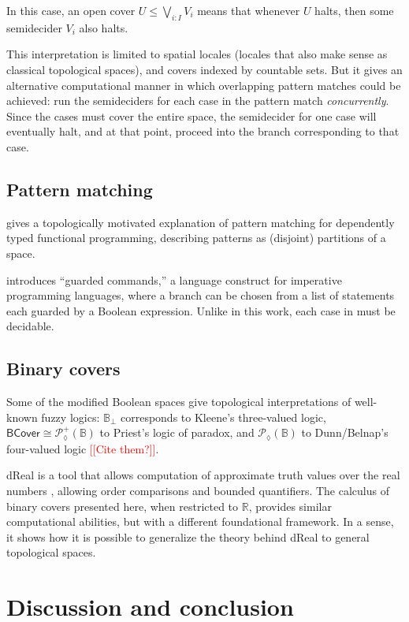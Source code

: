 \documentclass[conference]{IEEEtran}
\newcommand{\PLower}{\mathcal{P}_\lozenge}
\newcommand{\R}{\mathbb{R}}
\newcommand{\bool}{\mathbb{B}}
\newcommand{\BCover}{\mathsf{BCover}}
\newcommand{\note}[1]{\textcolor{red}{[[{#1}]]}}
\begin{document}
In this case, an open cover $U \le \bigvee_{i : I} V_i$ means that whenever $U$ halts, then some semidecider $V_i$ also halts.

This interpretation is limited to spatial locales (locales that also make sense as classical topological spaces), and covers indexed by countable sets. But it gives an alternative computational manner in which overlapping pattern matches could be achieved: run the semideciders for each case in the pattern match \emph{concurrently}. Since the cases must cover the entire space, the semidecider for one case will eventually halt, and at that point, proceed into the branch corresponding to that case.

\subsection{Pattern matching}

\cite{coquand1992} gives a topologically motivated explanation of pattern matching for dependently typed functional programming, describing patterns as (disjoint) partitions of a space.

\cite{dijkstra} introduces ``guarded commands,'' a language construct for imperative programming languages, where a branch can be chosen from a list of statements each guarded by a Boolean expression. Unlike in this work, each case in \cite{dijkstra} must be decidable.

\subsection{Binary covers}

Some of the modified Boolean spaces give topological interpretations of well-known fuzzy logics: $\bool_\bot$ corresponds to Kleene's three-valued logic, $\BCover \cong \PLower^+(\bool)$ to Priest's logic of paradox, and $\PLower(\bool)$ to Dunn/Belnap's four-valued logic \note{Cite them?}.

dReal is a tool that allows computation of approximate truth values over the real numbers \cite{dReal}, allowing order comparisons and bounded quantifiers. The calculus of binary covers presented here, when restricted to $\R$, provides similar computational abilities, but with a different foundational framework. In a sense, it shows how it is possible to generalize the theory behind dReal to general topological spaces.

\section{Discussion and conclusion}
\end{document}
